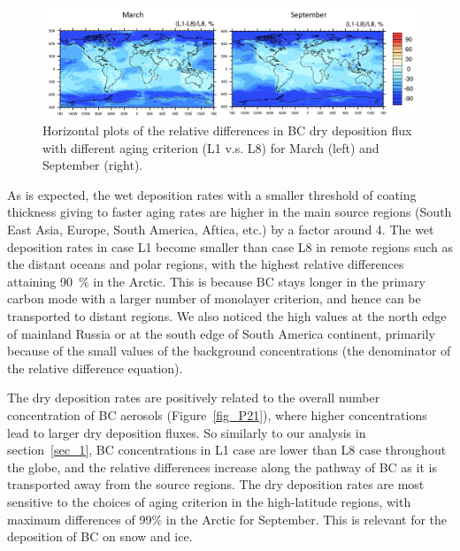 \documentclass[12pt, fullpage]{uiucthesis2009}
\begin{document}
	
	\begin{figure}[h] 
		\begin{center}
			\includegraphics[width = 1\textwidth]{Figure18}
			\caption[Horizontal plots of the relative differences in BC dry deposition flux with different aging criterion (L1 v.s. L8) for March (left) and September (right)]{\label{fig_P18} Horizontal plots of the relative differences in BC dry deposition flux with different aging criterion (L1 v.s. L8) for March (left) and September (right).}
		\end{center}
	\end{figure}
	
	As is expected, the wet deposition rates with a smaller threshold of coating thickness giving to faster aging rates are higher in the main source regions (South East Asia, Europe, South America, Aftica, etc.) by a factor around 4. The wet deposition rates in case L1 become smaller than case L8 in remote regions such as the distant oceans and polar regions, with the highest relative differences attaining 90~$\%$ in the Arctic. This is because BC stays longer in the primary carbon mode with a larger number of monolayer criterion, and hence can be transported to distant regions. We also noticed the high values at the north edge of mainland Russia or at the south edge of South America continent, primarily because of the small values of the background concentrations (the denominator of the relative difference equation).
	
	The dry deposition rates are positively related to the overall number concentration of BC aerosols (Figure~\ref{fig_P21}), where higher concentrations lead to larger dry deposition fluxes. So similarly to our analysis in section~\ref{sec_1}, BC concentrations in L1 case are lower than L8 case throughout the globe, and the relative differences increase along the pathway of BC as it is transported away from the source regions. The dry deposition rates are most sensitive to the choices of aging criterion in the high-latitude regions, with maximum differences of 99$\%$ in the Arctic for September. This is relevant for the deposition of BC on snow and ice.
	
\end{document}
